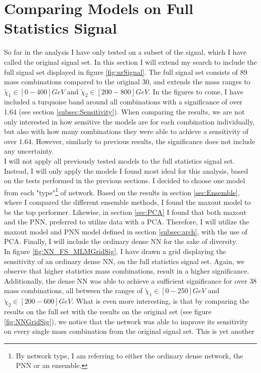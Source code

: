 \section{Comparing Models on Full Statistics Signal}
So far in the analysis I have only tested on a subset of the signal, which I have called the original signal set. In this section 
I will extend my search to include the full signal set displayed in figure \ref{fig:nrSignal}. The full signal set consists of 89 mass 
combinations compared to the original 30, and extends the mass ranges to $\tilde{\chi}_1 \in [0-400]GeV$ and $\tilde{\chi}_2 \in [200-800]GeV$.
In the figures to come, I have included a turquoise band around all combinations with a significance of over 1.64 (see section \ref{subsec:Sensitivity}).
When comparing the results, we are not only interested in how sensitive the models are for each combination individually, but also with how many combinations 
they were able to achieve a sensitivity of over 1.64. However, similarly to previous results, the significance does not include any uncertainty.
\\
I will not apply all previously tested models to the full statistics signal set. Instead, I will only apply the models I found most ideal for this analysis, based 
on the tests performed in the previous sections. I decided to choose one model from each "type"\footnote{By network type, I am referring to either the ordinary dense network, the 
\ac{PNN} or an ensemble. } of network. Based on the results in section \ref{sec:Ensemble}, where I compared the different ensemble methods, I found the maxout model to be 
the top performer. Likewise, in section \ref{sec:PCA} I found that both maxout and the \ac{PNN}, preferred to utilize data with a \ac{PCA}. Therefore, I will utilize the maxout model 
and \ac{PNN} model defined in section \ref{subsec:arch}, with the use of \ac{PCA}. Finally, I will include the ordinary dense \ac{NN} for the sake of diversity.
\\
In figure \ref{fig:NN_FS_MLMGridSig}, I have drawn a grid displaying the sensitivity of an ordinary dense \ac{NN}, on the full statistics signal set. Again, we observe that higher statistics
mass combinations, result in a higher significance. Additionally, the dense \ac{NN} was able to achieve a sufficient significance for over 38 mass combinations, all between the ranges of 
$\tilde{\chi}_1 \in [0-250]GeV$ and $\tilde{\chi}_2 \in [200-600]GeV$. What is even more interesting, is that by comparing the results on the full set with the results on the original 
set (see figure \ref{fig:NNGridSig}), we notice that the network was able to improve its sensitivity on every single mass combination from the original signal set. This is yet another 
